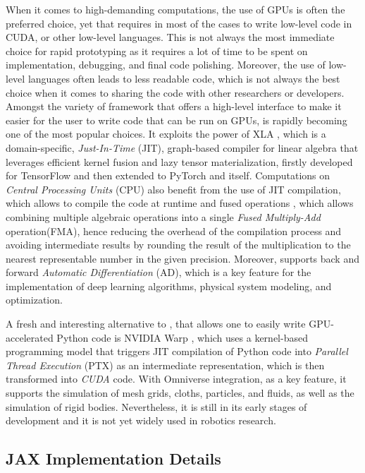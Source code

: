 When it comes to high-demanding computations, the use of \ac{GPU}s is often the preferred choice, yet that requires in most of the cases to write low-level code in \ac{CUDA}, \cpp or other low-level languages. This is not always the most immediate choice for rapid prototyping as it requires a lot of time to be spent on implementation, debugging, and final code polishing. Moreover, the use of low-level languages often leads to less readable code, which is not always the best choice when it comes to sharing the code with other researchers or developers. Amongst the variety of framework that offers a high-level interface to make it easier for the user to write code that can be run on \ac{GPU}s, \jax \citep{bradbury_jax_2018,47008} is rapidly becoming one of the most popular choices. It exploits the power of \ac{XLA} \citep{50530}, which is a domain-specific, \textit{Just-In-Time} (\ac{JIT}), graph-based compiler for linear algebra that leverages efficient kernel fusion and lazy tensor materialization, firstly developed for TensorFlow \citep{tensorflow2015-whitepaper} and then extended to PyTorch and \jax itself.
Computations on \textit{Central Processing Units} (\ac{CPU}) also benefit from the use of \ac{JIT} compilation, which allows to compile the code at runtime and fused operations \citep{wang_kernel_2010,snider_operator_2023}, which allows combining multiple algebraic operations into a single \textit{Fused Multiply-Add} operation(\ac{FMA}), hence reducing the overhead of the compilation process and avoiding intermediate results by rounding the result of the multiplication to the nearest representable number in the given precision.
Moreover, \jax supports back and forward \textit{Automatic Differentiation} (\ac{AD}), which is a key feature for the implementation of deep learning algorithms, physical system modeling, and optimization.

A fresh and interesting alternative to \jax, that allows one to easily write \ac{GPU}-accelerated Python code is NVIDIA Warp \citep{warp2022}, which uses a kernel-based programming model that triggers \ac{JIT} compilation of Python code into \textit{Parallel Thread Execution} (\ac{PTX}) as an intermediate representation, which is then transformed into \textit{CUDA} code. With Omniverse integration, as a key feature, it supports the simulation of mesh grids, cloths, particles, and fluids, as well as the simulation of rigid bodies. Nevertheless, it is still in its early stages of development and it is not yet widely used in robotics research.


\subsection{JAX Implementation Details}

